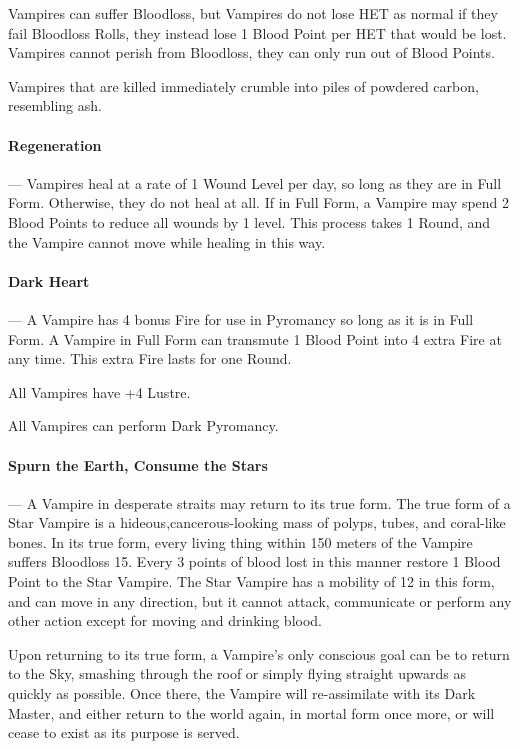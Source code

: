 \documentclass[oneside,11pt,english]{book}
\begin{document}
Vampires can suffer Bloodloss, but Vampires do not lose HET as normal if they fail Bloodloss 
Rolls, they instead lose 1 Blood Point per HET that would be lost. Vampires cannot perish from 
Bloodloss, they can only run out of Blood Points. 

Vampires that are killed immediately crumble into piles of powdered carbon, resembling ash. 

\paragraph{Regeneration}---\quad
Vampires heal at a rate of 1 Wound Level per day, so long as they are in Full Form. Otherwise, 
they do not heal at all. 
If in Full Form, a Vampire may spend 2 Blood Points to reduce all wounds by 1 level. This 
process takes 1 Round, and the Vampire cannot move while healing in this way. 

\paragraph{Dark Heart}---\quad
A Vampire has 4 bonus Fire for use in Pyromancy so long as it is in Full Form. 
A Vampire in Full Form can transmute 1 Blood Point into 4 extra Fire at any time. This extra Fire 
lasts for one Round. 

All Vampires have +4 Lustre. 

All Vampires can perform Dark Pyromancy. 

\paragraph{Spurn the Earth, Consume the Stars}---\quad
A Vampire in desperate straits may return to its true form. The true form of a Star Vampire is a 
hideous,cancerous-looking mass of polyps, tubes, and coral-like bones. In its true form, every 
living thing within 150 meters of the Vampire suffers Bloodloss 15. Every 3 points of blood lost in 
this manner restore 1 Blood Point to the Star Vampire. The Star Vampire has a mobility of 12 in 
this form, and can move in any direction, but it cannot attack, communicate or perform any other 
action except for moving and drinking blood. 

Upon returning to its true form, a Vampire's only conscious goal can be to return to the Sky, 
smashing through the roof or simply flying straight upwards as quickly as possible. Once there, 
the Vampire will re-assimilate with its Dark Master, and either return to the world again, in mortal 
form once more, or will cease to exist as its purpose is served. 
\end{document}

